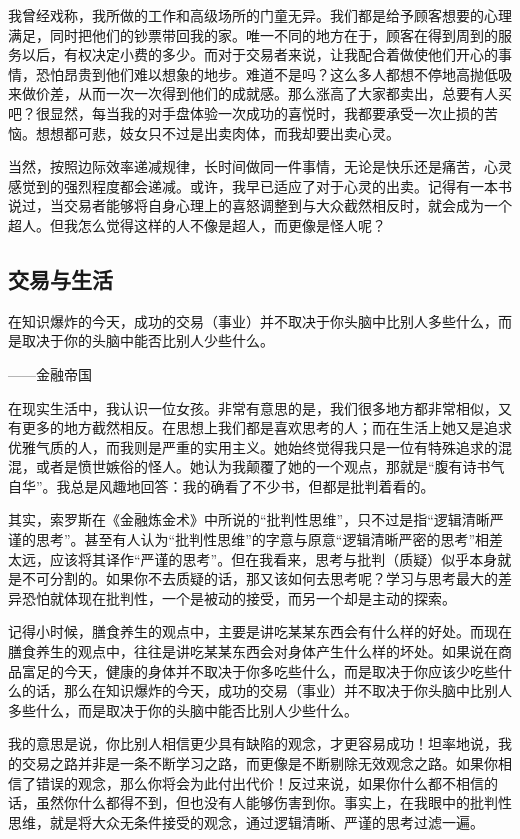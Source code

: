 我曾经戏称，我所做的工作和高级场所的门童无异。我们都是给予顾客想要的心理满足，同时把他们的钞票带回我的家。唯一不同的地方在于，顾客在得到周到的服务以后，有权决定小费的多少。而对于交易者来说，让我配合着做使他们开心的事情，恐怕昂贵到他们难以想象的地步。难道不是吗？这么多人都想不停地高抛低吸来做价差，从而一次一次得到他们的成就感。那么涨高了大家都卖出，总要有人买吧？很显然，每当我的对手盘体验一次成功的喜悦时，我都要承受一次止损的苦恼。想想都可悲，妓女只不过是出卖肉体，而我却要出卖心灵。

当然，按照边际效率递减规律，长时间做同一件事情，无论是快乐还是痛苦，心灵感觉到的强烈程度都会递减。或许，我早已适应了对于心灵的出卖。记得有一本书说过，当交易者能够将自身心理上的喜怒调整到与大众截然相反时，就会成为一个超人。但我怎么觉得这样的人不像是超人，而更像是怪人呢？

\subsection{交易与生活}

{\kaishu
在知识爆炸的今天，成功的交易（事业）并不取决于你头脑中比别人多些什么，而是取决于你的头脑中能否比别人少些什么。

\hfill ——金融帝国
}

在现实生活中，我认识一位女孩。非常有意思的是，我们很多地方都非常相似，又有更多的地方截然相反。在思想上我们都是喜欢思考的人；而在生活上她又是追求优雅气质的人，而我则是严重的实用主义。她始终觉得我只是一位有特殊追求的混混，或者是愤世嫉俗的怪人。她认为我颠覆了她的一个观点，那就是“腹有诗书气自华”。我总是风趣地回答：我的确看了不少书，但都是批判着看的。

其实，索罗斯在《金融炼金术》中所说的“批判性思维”，只不过是指“逻辑清晰严谨的思考”。甚至有人认为“批判性思维”的字意与原意“逻辑清晰严密的思考”相差太远，应该将其译作“严谨的思考”。但在我看来，思考与批判（质疑）似乎本身就是不可分割的。如果你不去质疑的话，那又该如何去思考呢？学习与思考最大的差异恐怕就体现在批判性，一个是被动的接受，而另一个却是主动的探索。

记得小时候，膳食养生的观点中，主要是讲吃某某东西会有什么样的好处。而现在膳食养生的观点中，往往是讲吃某某东西会对身体产生什么样的坏处。如果说在商品富足的今天，健康的身体并不取决于你多吃些什么，而是取决于你应该少吃些什么的话，那么在知识爆炸的今天，成功的交易（事业）并不取决于你头脑中比别人多些什么，而是取决于你的头脑中能否比别人少些什么。

我的意思是说，你比别人相信更少具有缺陷的观念，才更容易成功！坦率地说，我的交易之路并非是一条不断学习之路，而更像是不断剔除无效观念之路。如果你相信了错误的观念，那么你将会为此付出代价！反过来说，如果你什么都不相信的话，虽然你什么都得不到，但也没有人能够伤害到你。事实上，在我眼中的批判性思维，就是将大众无条件接受的观念，通过逻辑清晰、严谨的思考过滤一遍。


